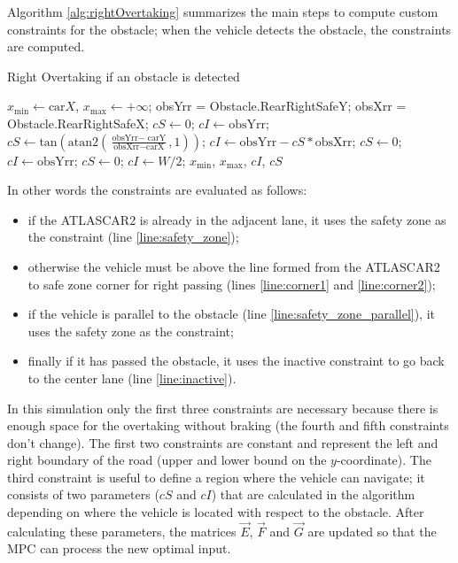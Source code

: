 Algorithm \ref{alg:rightOvertaking} summarizes the main steps to compute custom constraints for the obstacle; when the vehicle detects the obstacle, the constraints are computed.
\begin{algorithm}[!h]
	\caption{Right Overtaking if an obstacle is detected}
	\small
	\begin{algorithmic}[1]
		\State $x_\text{min} \gets \text{car}X $,  $x_\text{max} \gets +\infty$;
		\State obsYrr = Obstacle.RearRightSafeY;
		\State obsXrr = Obstacle.RearRightSafeX;
		\State $cS \gets 0$; $cI \gets \text{obsYrr}$; \label{line:safety_zone}
		\Else
		\State $cS \gets \text{tan}(\text{atan2}(\frac{\text{obsYrr}-\text{ carY}}{\text{obsXrr}-\text{carX}},1))$; \label{line:corner1}
		\State $cI \gets \text{obsYrr}-cS*\text{obsXrr}$;\label{line:corner2}
		\EndIf
		\Else
		\State $cS \gets 0$; $cI \gets \text{obsYrr}$;\label{line:safety_zone_parallel}
		\Else
		\State $cS \gets 0$; $cI \gets W/2$;\label{line:inactive}
		\EndIf
		\EndIf
		\State \Return $x_\text{min}$, $x_\text{max}$, $cI$, $cS$
		\State {}
		\EndFunction
	\end{algorithmic}
	\label{alg:rightOvertaking}
\end{algorithm}

In other words the constraints are evaluated as follows:
\begin{itemize}
	\item if the ATLASCAR2 is already in the adjacent lane, it uses the safety zone as the constraint (line \ref{line:safety_zone});
	\item otherwise the vehicle must be above the line formed from the ATLASCAR2 to safe zone corner for right passing (lines \ref{line:corner1} and \ref{line:corner2});
	\item if the vehicle is parallel to the obstacle (line \ref{line:safety_zone_parallel}), it  uses the safety zone as the constraint;
	\item finally if it has passed the obstacle, it uses the inactive constraint to go back to the center lane (line \ref{line:inactive}).
\end{itemize}

In this simulation only the first three constraints are necessary because there is enough space for the overtaking without braking (the fourth and fifth constraints don't change). The first two constraints are constant and represent the left and right boundary of the road (upper and lower bound on the $y$-coordinate). The third constraint is useful to define a region where the vehicle can navigate; it consists of two parameters ($cS$ and $cI$) that are calculated in the algorithm depending on where the vehicle is located with respect to the obstacle. After calculating these parameters, the matrices $\vec{E}$, $\vec{F}$ and $\vec{G}$ are updated so that the MPC can process the new optimal input. 

